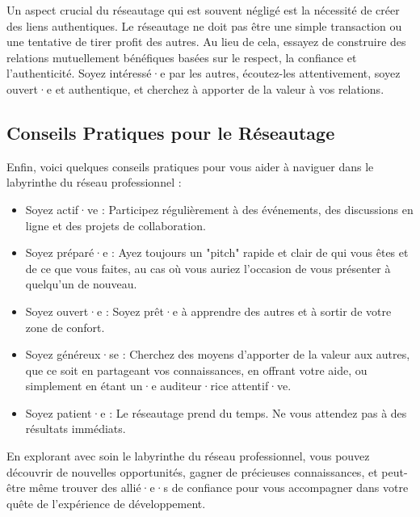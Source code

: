 Un aspect crucial du réseautage qui est souvent négligé est la nécessité de créer des liens authentiques. Le réseautage ne doit pas être une simple transaction ou une tentative de tirer profit des autres. Au lieu de cela, essayez de construire des relations mutuellement bénéfiques basées sur le respect, la confiance et l'authenticité. Soyez intéressé·e par les autres, écoutez-les attentivement, soyez ouvert·e et authentique, et cherchez à apporter de la valeur à vos relations.

\subsection{Conseils Pratiques pour le Réseautage}

Enfin, voici quelques conseils pratiques pour vous aider à naviguer dans le labyrinthe du réseau professionnel :

\begin{itemize}
    \item Soyez actif·ve : Participez régulièrement à des événements, des discussions en ligne et des projets de collaboration.

    \item Soyez préparé·e : Ayez toujours un "pitch" rapide et clair de qui vous êtes et de ce que vous faites, au cas où vous auriez l'occasion de vous présenter à quelqu'un de nouveau.

    \item Soyez ouvert·e : Soyez prêt·e à apprendre des autres et à sortir de votre zone de confort.

    \item Soyez généreux·se : Cherchez des moyens d'apporter de la valeur aux autres, que ce soit en partageant vos connaissances, en offrant votre aide, ou simplement en étant un·e auditeur·rice attentif·ve.

    \item Soyez patient·e : Le réseautage prend du temps. Ne vous attendez pas à des résultats immédiats.
\end{itemize}

En explorant avec soin le labyrinthe du réseau professionnel, vous pouvez découvrir de nouvelles opportunités, gagner de précieuses connaissances, et peut-être même trouver des allié·e·s de confiance pour vous accompagner dans votre quête de l'expérience de développement.